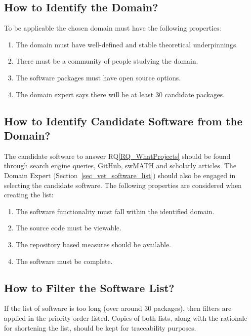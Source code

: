 \documentclass[runningheads]{llncs}
\newcommand{\rqref}[1]{RQ\ref{#1}}
\begin{document}
\subsection{How to Identify the Domain?} \label{SecIdentifyDomain} 

To be applicable the chosen domain must have the following properties:

\begin{enumerate}
\item The domain must have well-defined and stable theoretical underpinnings.
\item There must be a community of people studying the domain.
\item The software packages must have open source options.
\item The domain expert says there will be at least 30 candidate packages.
\end{enumerate}	

\subsection{How to Identify Candidate Software from the Domain?}
\label{identifysoftware}

The candidate software to answer \rqref{RQ_WhatProjects} should be found through
search engine queries,  
\href{https://github.com/} {GitHub}, \href{https://swmath.org/} {swMATH}
and scholarly articles. The Domain Expert (Section~\ref{sec_vet_software_list})
should also be engaged in selecting the candidate software.  The following
properties are considered when creating the list:

\begin{enumerate}
	\item The software functionality must fall within the identified domain.
	\item The source code must be viewable.
	\item The repository based measures should be available.
	\item The software must be complete.
\end{enumerate}

\subsection{How to Filter the Software List?} \label{filtersoftware}

If the list of software is too long (over around 30 packages), then filters are
applied in the priority order listed. Copies of both lists, along with the
rationale for shortening the list, should be kept for traceability purposes.
\end{document}
